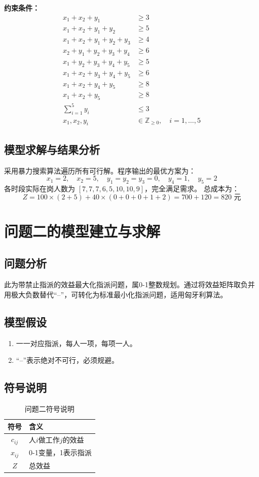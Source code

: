 \documentclass[12pt]{ctexart}
\begin{document}
\textbf{约束条件：}
\[
\begin{aligned}
x_1 + x_2 + y_1 &\geq 3 \\
x_1 + x_2 + y_1 + y_2 &\geq 5 \\
x_1 + x_2 + y_1 + y_2 + y_3 &\geq 4 \\
x_2 + y_1 + y_2 + y_3 + y_4 &\geq 6 \\
x_1 + y_2 + y_3 + y_4 + y_5 &\geq 5 \\
x_1 + x_2 + y_3 + y_4 + y_5 &\geq 6 \\
x_1 + x_2 + y_4 + y_5 &\geq 8 \\
x_1 + x_2 + y_5 &\geq 8 \\
\sum_{i=1}^{5} y_i &\leq 3 \\
x_1, x_2, y_i &\in \mathbb{Z}_{\geq 0}, \quad i=1,\dots,5
\end{aligned}
\]

\subsection{模型求解与结果分析}
采用暴力搜索算法遍历所有可行解。程序输出的最优方案为：
\[
x_1 = 2,\quad x_2 = 5,\quad y_1 = y_2 = y_3 = 0,\quad y_4 = 1,\quad y_5 = 2
\]
各时段实际在岗人数为 $[7, 7, 7, 6, 5, 10, 10, 9]$，完全满足需求。  
总成本为：
\[
Z = 100 \times (2 + 5) + 40 \times (0+0+0+1+2) = 700 + 120 = 820 \text{ 元}
\]

\section{问题二的模型建立与求解}

\subsection{问题分析}
此为带禁止指派的效益最大化指派问题，属0-1整数规划。通过将效益矩阵取负并用极大负数替代“–”，可转化为标准最小化指派问题，适用匈牙利算法。

\subsection{模型假设}
\begin{enumerate}[label=(\arabic*)]
    \item 一一对应指派，每人一项，每项一人。
    \item “–”表示绝对不可行，必须规避。
\end{enumerate}

\subsection{符号说明}
\begin{table}[htbp]
    \centering
    \caption{问题二符号说明}
    \begin{tabular}{cl}
        \toprule
        符号 & 含义 \\
        \midrule
        $c_{ij}$ & 人$i$做工作$j$的效益 \\
        $x_{ij}$ & 0-1变量，1表示指派 \\
        $Z$ & 总效益 \\
        \bottomrule
    \end{tabular}
\end{table}
\end{document}
